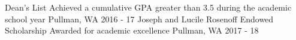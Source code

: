 \begin{cvhonors}
  \cvhonor
    {Dean's List}
    {Achieved a cumulative GPA greater than 3.5 during the academic school year}
    {Pullman, WA}
    {2016 - 17}
  \cvhonor
    {Joseph and Lucile Rosenoff Endowed Scholarship}
    {Awarded for academic excellence}
    {Pullman, WA}
    {2017 - 18}
\end{cvhonors}